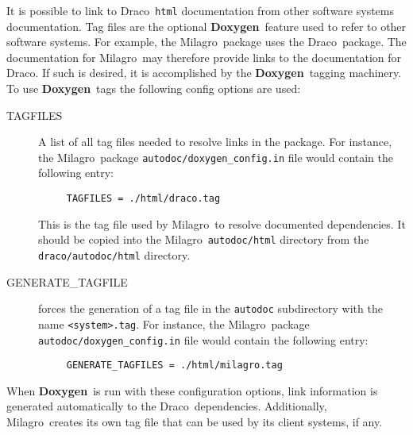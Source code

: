 \documentclass[11pt]{ResearchNote}
\newcommand{\draco}{{\normalfont\sffamily Draco}}
\newcommand{\milagro}{{\normalfont\sffamily Milagro}}
\newcommand{\doxy}{{\normalfont\bfseries Doxygen}}
\begin{document}
It is possible to link to \draco\ \texttt{html} documentation from other
software systems documentation.
Tag files are the  optional \doxy\ feature used to refer to other software systems. 
For example, the \milagro\
package uses the \draco\ package.  The documentation for \milagro\
may therefore provide links to the documentation for \draco.  If such is 
desired, it is  accomplished
by the \doxy\ tagging machinery.  To use \doxy\ tags the following
config options are used:
\begin{description}

\item[\ttfamily TAGFILES] A list of all tag files needed to resolve
  links in the package.  For instance, the \milagro\ package
  \texttt{autodoc/doxygen\_config.in} file would contain the following entry:
\begin{verbatim}
     TAGFILES = ./html/draco.tag
\end{verbatim}
  This is  the tag file used by \milagro\ to resolve documented
  dependencies. It should be copied into the \milagro\ \texttt{autodoc/html}
  directory from the \texttt{draco/autodoc/html} directory.

\item[\ttfamily GENERATE\_TAGFILE] forces the generation of
  a tag file in the \texttt{autodoc} subdirectory with the name 
  \texttt{<system>.tag}.
For instance, the \milagro\ package
  \texttt{autodoc/doxygen\_config.in} file would contain the following entry:
\begin{verbatim}
     GENERATE_TAGFILES = ./html/milagro.tag
\end{verbatim}

\end{description}
When \doxy\ is run with these configuration options, link information
is generated automatically to the \draco\ dependencies.  Additionally, 
\milagro\ creates its own tag file that can be used by its client
systems, if any.
\end{document}
